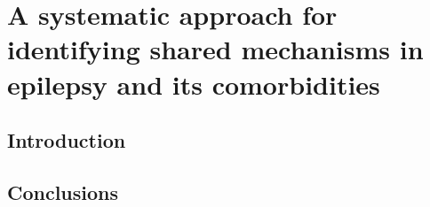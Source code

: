 \chapter{A systematic approach for identifying shared mechanisms in epilepsy and its comorbidities}\label{chap:epicom}

\section*{Introduction}

\vspace*{\fill}



\section*{Conclusions}
